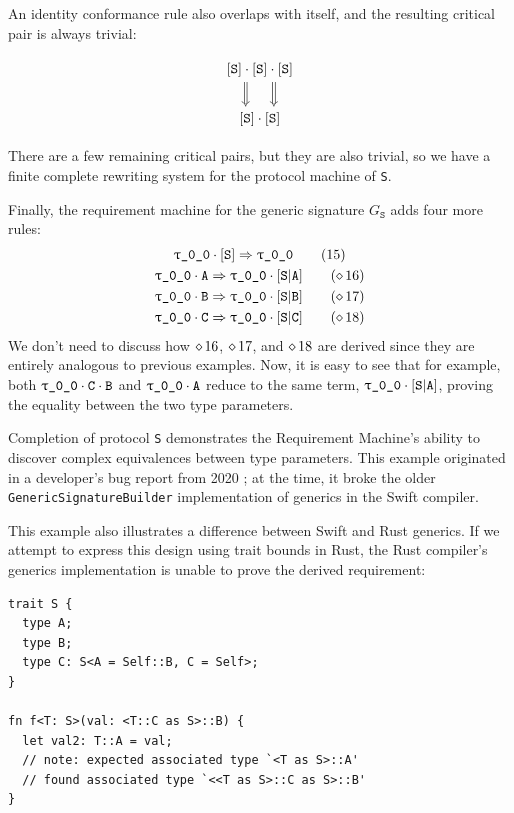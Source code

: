 \documentclass[../generics]{subfiles}
\begin{document}
\begin{example}
An identity conformance rule also overlaps with itself, and the resulting critical pair is always trivial:
\begin{ceqn}
\[
\begin{tikzcd}
\protosym{S}\cdot\protosym{S}\cdot\protosym{S}\arrow[d, Rightarrow, xshift=-10pt]\arrow[d, Rightarrow, xshift=10pt]\\
\protosym{S}\cdot\protosym{S}
\end{tikzcd}
\]
\end{ceqn}
There are a few remaining critical pairs, but they are also trivial, so we have a finite complete rewriting system for the protocol machine of \texttt{S}.

Finally, the requirement machine for the generic signature $G_{\texttt{S}}$ adds four more rules:
\begin{gather*}
\rT \cdot \protosym{S} \Red \rT \tag{15} \\
\rT \cdot \nA \Red \rT \cdot \assocsym{S}{A} \tag{$\CRule{16}$} \\
\rT \cdot \nB \Red \rT \cdot \assocsym{S}{B} \tag{$\CRule{17}$} \\
\rT \cdot \nC \Red \rT \cdot \assocsym{S}{C} \tag{$\CRule{18}$}
\end{gather*}
We don't need to discuss how $\diamond\, 16$, $\diamond\, 17$, and $\diamond\, 18$ are derived since they are entirely analogous to previous examples. Now, it is easy to see that for example, both $\rT \cdot \nC \cdot \nB$ and $\rT \cdot \nA$ reduce to the same term, $\rT \cdot \assocsym{S}{A}$, proving the equality between the two type parameters.

Completion of protocol \texttt{S} demonstrates the Requirement Machine's ability to discover complex equivalences between type parameters. This example originated in a developer's bug report from 2020 \cite{sr12120}; at the time, it broke the older \texttt{GenericSignatureBuilder} implementation of generics in the Swift compiler.

This example also illustrates a difference between Swift and Rust generics. If we attempt to express this design using trait bounds in Rust, the Rust compiler's generics implementation is unable to prove the derived requirement:
\begin{Verbatim}
trait S {
  type A;
  type B;
  type C: S<A = Self::B, C = Self>;
}

fn f<T: S>(val: <T::C as S>::B) {
  let val2: T::A = val;
  // note: expected associated type `<T as S>::A'
  // found associated type `<<T as S>::C as S>::B'
}
\end{Verbatim}
\end{example}
\end{document}

